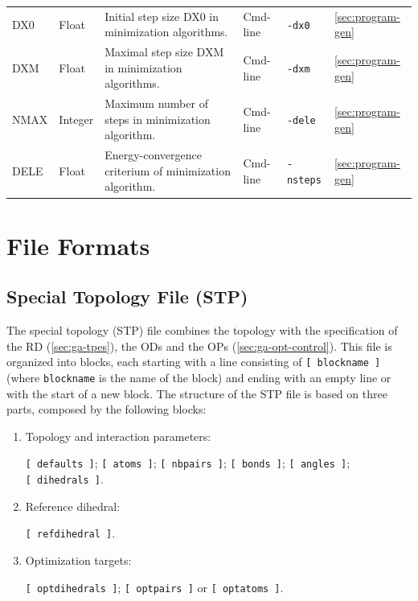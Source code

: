 \documentclass[10pt,a4paper,openany]{memoir}
\numberwithin{equation}{section}
\begin{document}
\begin{landscape}
\begin{center}
\begin{longtable}{llllll}
      DX0 & Float & Initial step size DX0 in minimization algorithms. & Cmd-line & \texttt{-dx0} & \autoref{sec:program-gen}\\
      DXM & Float & Maximal step size DXM in minimization algorithms. & Cmd-line & \texttt{-dxm} & \autoref{sec:program-gen}\\
      NMAX & Integer & Maximum number of steps in minimization algorithm. & Cmd-line & \texttt{-dele} & \autoref{sec:program-gen}\\
      DELE & Float & Energy-convergence criterium of minimization algorithm. & Cmd-line & \texttt{-nsteps} & \autoref{sec:program-gen}\\
      \bottomrule
      \end{longtable}
    \end{center}
\end{landscape}

\section{File Formats}
\label{sec:file-formats-file-formats}

\subsection{Special Topology File (STP)}
\label{sec:file-formats-STP}

The special topology (STP) file combines the topology with the
specification of the RD (\autoref{sec:ga-tpes}), the ODs and the OPs
(\autoref{sec:ga-opt-control}).  This file is organized into blocks,
each starting with a line consisting of \texttt{[~blockname~]} (where
\texttt{blockname} is the name of the block) and ending with an empty
line or with the start of a new block.  The structure of the STP file
is based on three parts, composed by the following blocks:
\begin{enumerate}
\item Topology and interaction parameters:\par \texttt{[~defaults~]}; \texttt{[~atoms~]}; \texttt{[~nbpairs~]}; \texttt{[~bonds~]}; \texttt{[~angles~]}; \texttt{[~dihedrals~]}.
\item Reference dihedral:\par\texttt{[~refdihedral~]}.
\item Optimization targets:\par\texttt{[~optdihedrals~]}; \texttt{[~optpairs~]} or \texttt{[~optatoms~]}.
\end{enumerate}
\end{document}
